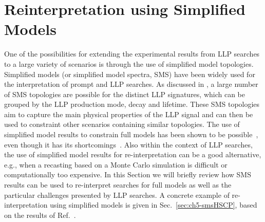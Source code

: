 \section{Reinterpretation using Simplified Models}
\label{sec:ch5-smsReinterpretations}

One of the possibilities for extending the experimental results from LLP
searches to a large variety of scenarios is through the use of simplified model topologies.
Simplified models (or simplified model spectra, SMS) have been widely used for the interpretation of
prompt and LLP searches. As discussed in {}, a large
number of SMS topologies are possible for the distinct LLP signatures, which
can be grouped by the LLP production mode, decay and lifetime.
These SMS topologies aim to capture the main physical properties of the LLP
signal and can then be used to constraint other scenarios containing similar
topologies.
The use of simplified model results to constrain full models has been
shown to be possible~\cite{Kraml:2013mwa,Papucci:2014rja,Belanger:2015cra,Barducci:2015zna,Arina:2015uea,Ambrogi:2017lov}, 
even though it has its shortcomings~\cite{Ambrogi:2017lov}.
Also within the context of LLP searches, the use of
simplified model results for re-interpretation can be a good alternative, e.g.,
when a recasting based on a Monte Carlo simulation is difficult or
computationally too expensive.
In this Section we will briefly review how 
SMS results can be used to re-interpret searches for full
models as well as the particular challenges presented by LLP searches.
A concrete example of re-interpretation using simplified models is given in
Sec.~\ref{sec:ch5-smsHSCP}, based on the results of Ref.~\cite{Heisig:2015yla}.


